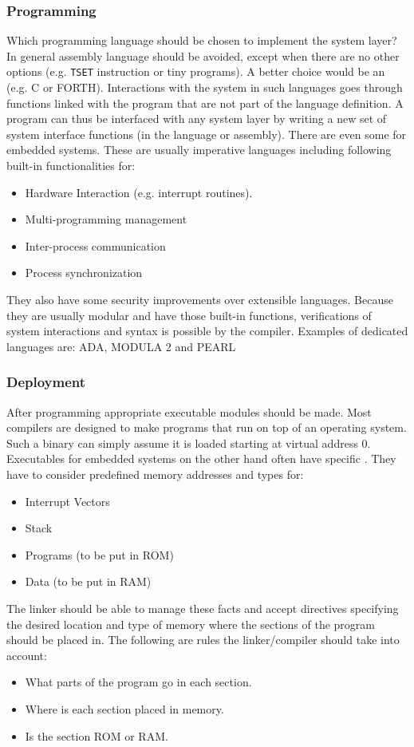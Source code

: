 \subsubsection{Programming}
Which  programming language should be chosen to implement the system layer? 
In general assembly language should be avoided, except when there are no other options (e.g. \texttt{TSET} instruction or tiny programs).
A better choice would be an  (e.g. C or FORTH).
Interactions with the system in such languages goes through functions linked with the program that are not part of the language definition. 
A program can thus be interfaced with any system layer by writing a new set of system interface functions (in the language or assembly).
There are even some  for embedded systems. 
These are usually imperative languages including following built-in functionalities for:
\begin{itemize}
	\item Hardware Interaction (e.g. interrupt routines).
	\item Multi-programming management
	\item Inter-process communication
	\item Process synchronization
\end{itemize}
They also have some security improvements over extensible languages.
Because they are usually modular and have those built-in functions, verifications of system interactions and syntax is possible by the compiler.
Examples of dedicated languages are: ADA, MODULA 2 and PEARL

\subsubsection{Deployment}
After programming appropriate executable modules should be made.
Most compilers are designed to make programs that run on top of an operating system. Such a binary can simply assume it is loaded starting at virtual address 0.
Executables for embedded systems on the other hand often have specific . They have to consider predefined memory addresses and types for:
\begin{itemize}
	\item Interrupt Vectors 
	\item Stack
	\item Programs (to be put in ROM)
	\item Data (to be put in RAM)
\end{itemize}
The linker should be able to manage these facts and accept directives specifying the desired location and type of memory where the sections of the program should be placed in. 
The following are rules the linker/compiler should take into account:
\begin{itemize}
	\item What parts of the program go in each section. 
	\item Where is each section placed in memory.
	\item Is the section ROM or RAM.
\end{itemize}

